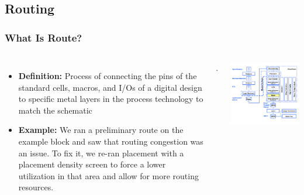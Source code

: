 \documentclass[compress]{beamer}
\begin{document}
\subsection[Rout]{Routing}
\begin{frame}
	\frametitle{What Is Route?}
	\begin{columns}
		\begin{itemize}
			\item \textbf {Definition:} Process of
			connecting the pins of the
			standard cells, macros, and
			I/Os of a digital design to
			specific metal layers in the
			process technology to
			match the schematic
			\item \textbf {Example:} We ran a
			preliminary route on the
			example block and saw that
			routing congestion was an
			issue. To fix it, we re-ran
			placement with a placement
			density screen to force a
			lower utilization in that area
			and allow for more routing
			resources.
		\end{itemize}.
		\begin{center}
			\includegraphics[width=\textwidth]{route}
		\end{center}
	\end{columns}
\end{frame}
\end{document}
